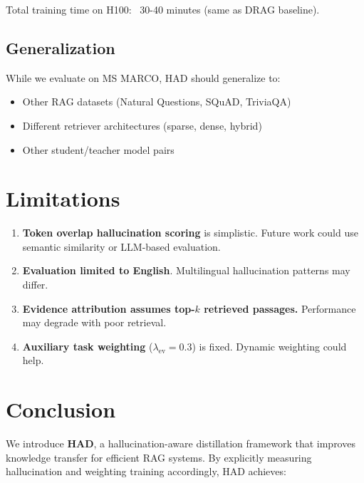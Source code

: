\documentclass[11pt,a4paper]{article}
\begin{document}
Total training time on H100: ~30-40 minutes (same as DRAG baseline).

\subsection{Generalization}

While we evaluate on MS MARCO, HAD should generalize to:
\begin{itemize}
    \item Other RAG datasets (Natural Questions, SQuAD, TriviaQA)
    \item Different retriever architectures (sparse, dense, hybrid)
    \item Other student/teacher model pairs
\end{itemize}

\section{Limitations}

\begin{enumerate}
    \item \textbf{Token overlap hallucination scoring} is simplistic. Future work could use semantic similarity or LLM-based evaluation.
    \item \textbf{Evaluation limited to English}. Multilingual hallucination patterns may differ.
    \item \textbf{Evidence attribution assumes top-$k$ retrieved passages.} Performance may degrade with poor retrieval.
    \item \textbf{Auxiliary task weighting} ($\lambda_{\text{ev}} = 0.3$) is fixed. Dynamic weighting could help.
\end{enumerate}

\section{Conclusion}
\label{sec:conclusion}

We introduce \textbf{HAD}, a hallucination-aware distillation framework that improves knowledge transfer for efficient RAG systems. By explicitly measuring hallucination and weighting training accordingly, HAD achieves:
\end{document}
